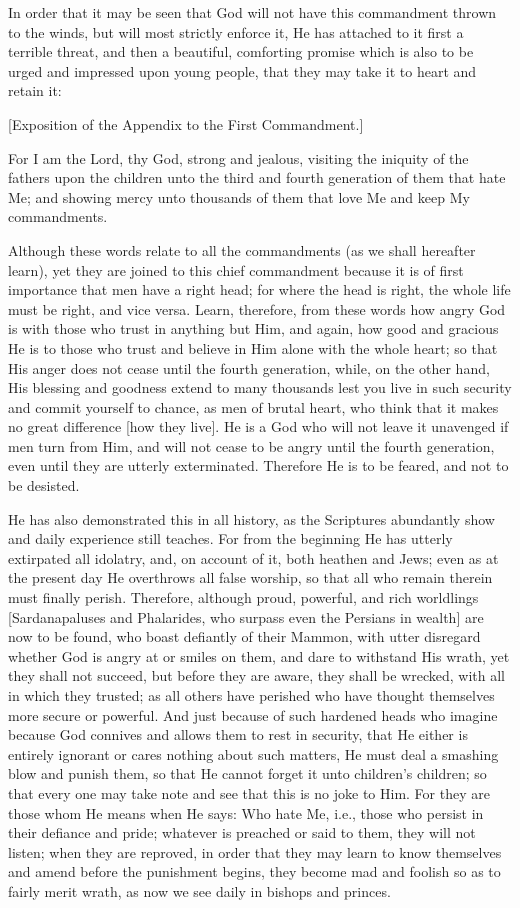 In order that it may be seen that God will not have this commandment
thrown to the winds, but will most strictly enforce it, He has attached
to it first a terrible threat, and then a beautiful, comforting promise
which is also to be urged and impressed upon young people, that they
may take it to heart and retain it:

[Exposition of the Appendix to the First Commandment.]


For I am the Lord, thy God, strong and jealous, visiting the iniquity
of the fathers upon the children unto the third and fourth generation
of them that hate Me; and showing mercy unto thousands of them that
love Me and keep My commandments.

Although these words relate to all the commandments (as we shall
hereafter learn), yet they are joined to this chief commandment
because it is of first importance that men have a right head; for
where the head is right, the whole life must be right, and vice versa.
Learn, therefore, from these words how angry God is with those who
trust in anything but Him, and again, how good and gracious He is to
those who trust and believe in Him alone with the whole heart; so that
His anger does not cease until the fourth generation, while, on the
other hand, His blessing and goodness extend to many thousands lest you
live in such security and commit yourself to chance, as men of brutal
heart, who think that it makes no great difference [how they live]. He
is a God who will not leave it unavenged if men turn from Him, and will
not cease to be angry until the fourth generation, even until they are
utterly exterminated. Therefore He is to be feared, and not to be
desisted.

He has also demonstrated this in all history, as the Scriptures
abundantly show and daily experience still teaches. For from the
beginning He has utterly extirpated all idolatry, and, on account of
it, both heathen and Jews; even as at the present day He overthrows all
false worship, so that all who remain therein must finally perish.
Therefore, although proud, powerful, and rich worldlings
[Sardanapaluses and Phalarides, who surpass even the Persians in
wealth] are now to be found, who boast defiantly of their Mammon, with
utter disregard whether God is angry at or smiles on them, and dare to
withstand His wrath, yet they shall not succeed, but before they are
aware, they shall be wrecked, with all in which they trusted; as all
others have perished who have thought themselves more secure or
powerful. And just because of such hardened heads who imagine because
God connives and allows them to rest in security, that He either is
entirely ignorant or cares nothing about such matters, He must deal a
smashing blow and punish them, so that He cannot forget it unto
children's children; so that every one may take note and see that this
is no joke to Him. For they are those whom He means when He says: Who
hate Me, i.e., those who persist in their defiance and pride; whatever
is preached or said to them, they will not listen; when they are
reproved, in order that they may learn to know themselves and amend
before the punishment begins, they become mad and foolish so as to
fairly merit wrath, as now we see daily in bishops and princes.

